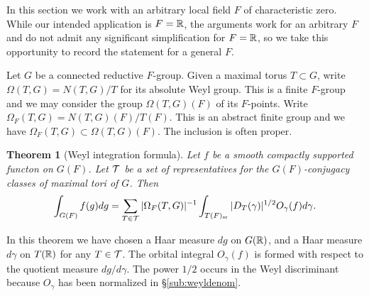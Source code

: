\documentclass{article}
\newtheorem{thm}{Theorem}[subsection]
\theoremstyle{definition}
\numberwithin{equation}{section}
\renewcommand{\-}{\hyp{}}
\begin{document}
In this section we work with an arbitrary local field $F$ of characteristic zero. While our intended application is $F=\mathbb{R}$, the arguments work for an arbitrary $F$ and do not admit any significant simplification for $F=\mathbb{R}$, so we take this opportunity to record the statement for a general $F$. 

Let $G$ be a connected reductive $F$-group. Given a maximal torus $T \subset G$, write $\Omega(T,G)=N(T,G)/T$ for its absolute Weyl group. This is a finite $F$-group and we may consider the group $\Omega(T,G)(F)$ of its $F$-points. Write $\Omega_F(T,G)=N(T,G)(F)/T(F)$. This is an abstract finite group and we have $\Omega_F(T,G) \subset \Omega(T,G)(F)$. The inclusion is often proper.



\begin{thm}[Weyl integration formula] \label{thm:weyl}
	Let $f$ be a smooth compactly supported functon on $G(F)$. Let $\mathcal{T}$ be a set of representatives for the $G(F)$-conjugacy classes of maximal tori of $G$.
	Then
	\[ \int_{G(F)}f(g)dg = \sum_{T \in \mathcal{T}}|\Omega_F(T,G)|^{-1}\int_{T(F)_{\textrm{sr}}} |D_T(\gamma)|^{1/2}O_\gamma(f)d\gamma. \]
\end{thm}

In this theorem we have chosen a Haar measure $dg$ on $G(\mathbb{R})$, and a Haar measure $d\gamma$ on $T(\mathbb{R})$ for any $T \in \mathcal{T}$. The orbital integral $O_\gamma(f)$ is formed with respect to the quotient measure $dg/d\gamma$. The power $1/2$ occurs in the Weyl discriminant because $O_\gamma$ has been normalized in \S\ref{sub:weyldenom}.
\end{document}
